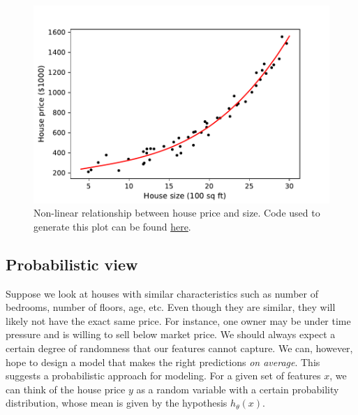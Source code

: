 \documentclass{article}
\theoremstyle{definition}
\begin{document}
\begin{figure}[ht]
\centering
\includegraphics[scale=0.7]{images/lin_reg/poly-data.pdf}
\caption{Non-linear relationship between house price and size. Code used to generate this plot can be found \href{https://github.com/siavashaslanbeigi/ml_notes/blob/master/src/lin_reg/poly.ipynb}{\color{blue} here}.}
\label{linreg-fig:poly-data}
\end{figure}



\subsection{Probabilistic view}
Suppose we look at houses with similar characteristics such as number of bedrooms, number of floors, age, etc. Even though they are similar, they will likely not have the exact same price. For instance, one owner may be under time pressure and is willing to sell below market price. We should always expect a certain degree of randomness that our features cannot capture. We can, however, hope to design a model that makes the right predictions \textit{on average}. This suggests a probabilistic approach for modeling. For a given set of features $x$, we can think of the house price $y$ as a random variable with a certain probability distribution, whose mean is given by the hypothesis $h_{\theta}(x)$.
\end{document}
